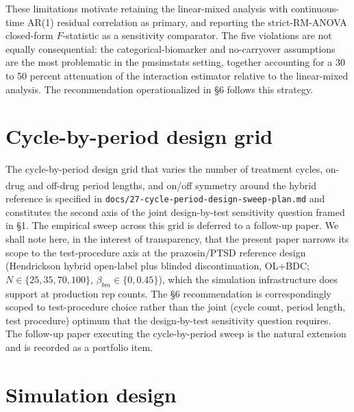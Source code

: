 \documentclass[
  11pt,
]{article}
\begin{document}
These limitations motivate retaining the linear-mixed analysis
with continuous-time AR(1) residual correlation as primary, and
reporting the strict-RM-ANOVA closed-form \(F\)-statistic as a
sensitivity comparator. The five violations are not equally
consequential: the categorical-biomarker and no-carryover
assumptions are the most problematic in the pmsimstats setting,
together accounting for a 30 to 50 percent attenuation of the
interaction estimator relative to the linear-mixed analysis. The
recommendation operationalized in \S6 follows this strategy.

\section{Cycle-by-period design grid}\label{cycle-by-period-design-grid}

The cycle-by-period design grid that varies the number of
treatment cycles, on-drug and off-drug period lengths, and on/off
symmetry around the\textsuperscript{} hybrid reference is
specified in \texttt{docs/27-cycle-period-design-sweep-plan.md} and
constitutes the second axis of the joint design-by-test
sensitivity question framed in \S1. The empirical sweep across
this grid is deferred to a follow-up paper. We shall note here,
in the interest of transparency, that the present paper narrows
its scope to the test-procedure axis at the prazosin/PTSD
reference design (Hendrickson hybrid open-label plus blinded
discontinuation, OL+BDC; \(N \in \{25, 35, 70, 100\}\),
\(\beta_{bm} \in \{0, 0.45\}\)), which the simulation infrastructure
does support at production rep counts. The \S6 recommendation is
correspondingly scoped to test-procedure choice rather than the
joint (cycle count, period length, test procedure) optimum that
the design-by-test sensitivity question requires. The follow-up paper executing the
cycle-by-period sweep is the natural extension and is recorded as
a portfolio item.

\section{Simulation design}\label{simulation-design}
\end{document}
